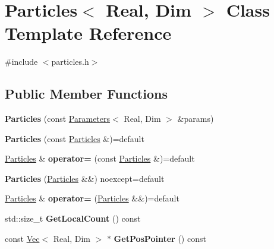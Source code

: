 \hypertarget{classParticles}{}\section{Particles$<$ Real, Dim $>$ Class Template Reference}
\label{classParticles}


{\ttfamily \#include $<$particles.\+h$>$}

\subsection*{Public Member Functions}
\begin{DoxyCompactItemize}
\item 
\hypertarget{classParticles_afbc7577a0e615e5a5db7b98fb5f839b6}{}{\bfseries Particles} (const \hyperlink{classParameters}{Parameters}$<$ Real, Dim $>$ \&params)\label{classParticles_afbc7577a0e615e5a5db7b98fb5f839b6}

\item 
\hypertarget{classParticles_a51e541617bdd2a204724bd0c3e997fc3}{}{\bfseries Particles} (const \hyperlink{classParticles}{Particles} \&)=default\label{classParticles_a51e541617bdd2a204724bd0c3e997fc3}

\item 
\hypertarget{classParticles_a43f02a77234a0d5b2a6c7c2ed9cc0a09}{}\hyperlink{classParticles}{Particles} \& {\bfseries operator=} (const \hyperlink{classParticles}{Particles} \&)=default\label{classParticles_a43f02a77234a0d5b2a6c7c2ed9cc0a09}

\item 
\hypertarget{classParticles_ac6968476f343fd1ccb04dd472fa37fdc}{}{\bfseries Particles} (\hyperlink{classParticles}{Particles} \&\&) noexcept=default\label{classParticles_ac6968476f343fd1ccb04dd472fa37fdc}

\item 
\hypertarget{classParticles_a5bf21900b3c6f0844cd00240b7ea8c24}{}\hyperlink{classParticles}{Particles} \& {\bfseries operator=} (\hyperlink{classParticles}{Particles} \&\&)=default\label{classParticles_a5bf21900b3c6f0844cd00240b7ea8c24}

\item 
\hypertarget{classParticles_ab1b026560eee1addc65dd542f9e113ab}{}std\+::size\+\_\+t {\bfseries Get\+Local\+Count} () const \label{classParticles_ab1b026560eee1addc65dd542f9e113ab}

\item 
\hypertarget{classParticles_abece4a4077ba246fae9e8fd9dd397bbf}{}const \hyperlink{structVec}{Vec}$<$ Real, Dim $>$ $\ast$ {\bfseries Get\+Pos\+Pointer} () const \label{classParticles_abece4a4077ba246fae9e8fd9dd397bbf}


\end{DoxyCompactItemize}
